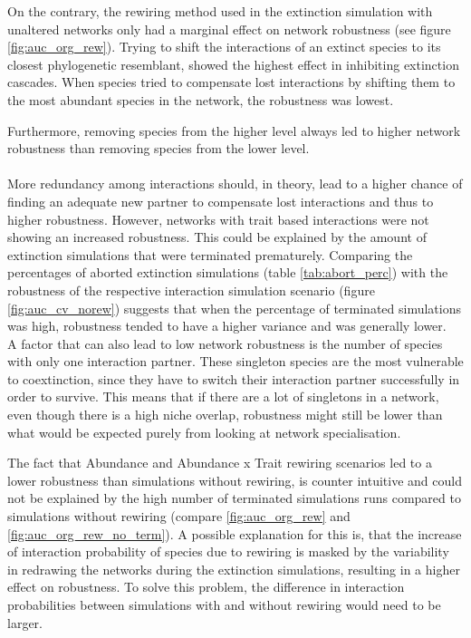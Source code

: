 \documentclass[12pt,a4paper]{article}
\begin{document}
On the contrary, the rewiring method used in the extinction simulation with unaltered networks only had a marginal effect on network robustness (see figure \ref{fig:auc_org_rew}). Trying to shift the interactions of an extinct species to its closest phylogenetic resemblant, showed the highest effect in inhibiting extinction cascades. When species tried to compensate lost interactions by shifting them to the most abundant species in the network, the robustness was lowest.

Furthermore, removing species from the higher level always led to higher network robustness than removing species from the lower level.
\paragraph{}

More redundancy among interactions should, in theory, lead to a higher chance of finding an adequate new partner to compensate lost interactions and thus to higher robustness. However, networks with trait based interactions were not showing an increased robustness. This could be explained by the amount of extinction simulations that were terminated prematurely. Comparing the percentages of aborted extinction simulations (table \ref{tab:abort_perc}) with the robustness of the respective interaction simulation scenario (figure \ref{fig:auc_cv_norew}) suggests that when the percentage of terminated simulations was high, robustness tended to have a higher variance and was generally lower.\\ A factor that can also lead to low network robustness is the number of species with only one interaction partner. These singleton species are the most vulnerable to coextinction, since they have to switch their interaction partner successfully in order to survive. This means that if there are a lot of singletons in a network, even though there is a high niche overlap, robustness might still be lower than what would be expected purely from looking at network specialisation.

The fact that Abundance and Abundance x Trait rewiring scenarios led to a lower robustness than simulations without rewiring, is counter intuitive and could not be explained by the high number of terminated simulations runs compared to simulations without rewiring (compare \ref{fig:auc_org_rew} and \ref{fig:auc_org_rew_no_term}). A possible explanation for this is, that the increase of interaction probability of species due to rewiring is masked by the variability in redrawing the networks during the extinction simulations, resulting in a higher effect on robustness. To solve this problem, the difference in interaction probabilities between simulations with and without rewiring would need to be larger.
\end{document}
